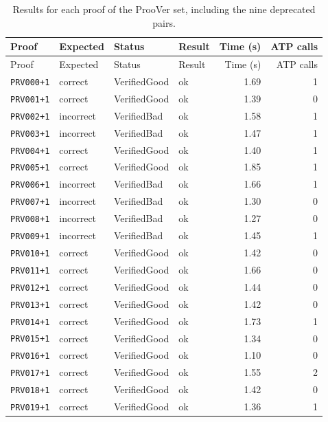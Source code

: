 \begin{longtable}{@{}l l l l r r@{}}
\caption{Results for each proof of the ProoVer set, including the nine deprecated pairs.}\label{tab:app-prv}\\
\toprule
Proof & Expected & Status & Result & Time (s) & ATP calls \\
\midrule
\endfirsthead
\toprule
Proof & Expected & Status & Result & Time (s) & ATP calls \\
\midrule
\endhead
\bottomrule
\endlastfoot
\texttt{PRV000{+}1} & correct & VerifiedGood & ok & 1.69 & 1 \\
\texttt{PRV001{+}1} & correct & VerifiedGood & ok & 1.39 & 0 \\
\texttt{PRV002{+}1} & incorrect & VerifiedBad & ok & 1.58 & 1 \\
\texttt{PRV003{+}1} & incorrect & VerifiedBad & ok & 1.47 & 1 \\
\texttt{PRV004{+}1} & correct & VerifiedGood & ok & 1.40 & 1 \\
\texttt{PRV005{+}1} & correct & VerifiedGood & ok & 1.85 & 1 \\
\texttt{PRV006{+}1} & incorrect & VerifiedBad & ok & 1.66 & 1 \\
\texttt{PRV007{+}1} & incorrect & VerifiedBad & ok & 1.30 & 0 \\
\texttt{PRV008{+}1} & incorrect & VerifiedBad & ok & 1.27 & 0 \\
\texttt{PRV009{+}1} & incorrect & VerifiedBad & ok & 1.45 & 1 \\
\texttt{PRV010{+}1} & correct & VerifiedGood & ok & 1.42 & 0 \\
\texttt{PRV011{+}1} & correct & VerifiedGood & ok & 1.66 & 0 \\
\texttt{PRV012{+}1} & correct & VerifiedGood & ok & 1.44 & 0 \\
\texttt{PRV013{+}1} & correct & VerifiedGood & ok & 1.42 & 0 \\
\texttt{PRV014{+}1} & correct & VerifiedGood & ok & 1.73 & 1 \\
\texttt{PRV015{+}1} & correct & VerifiedGood & ok & 1.34 & 0 \\
\texttt{PRV016{+}1} & correct & VerifiedGood & ok & 1.10 & 0 \\
\texttt{PRV017{+}1} & correct & VerifiedGood & ok & 1.55 & 2 \\
\texttt{PRV018{+}1} & correct & VerifiedGood & ok & 1.42 & 0 \\
\texttt{PRV019{+}1} & correct & VerifiedGood & ok & 1.36 & 1 \\

\end{longtable}
